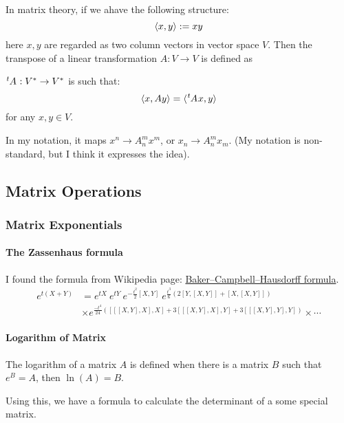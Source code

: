     In matrix theory, if we ahave the following structure:
    $$\braket{x,y} := x y$$
    here $x,y$ are regarded as two column vectors in vector space $V$.
    Then the transpose of a linear transformation $A:V\to V$ is defined
    as
    \begin{defi}[Transpose]
        $\tensor[^t]{A}{}:V^* \to V^*$ is such that:
        \begin{equation}
            \braket{x,Ay} = \braket{\tensor[^t]{A}{}x,y}
        \end{equation}
        for any $x,y\in V$.
    \end{defi}

    In my notation, it maps $x^n\to A^m_n x^m$, or $x_n\to A^m_n x_m$.
    (My notation is non-standard, but I think it expresses the idea).


\subsection{Matrix Operations}
    \subsubsection{Matrix Exponentials}
    \label{sec:Matrix-Exponentials}
    \paragraph{The Zassenhaus formula}
    I found the formula from Wikipedia page:
    \href{https://en.wikipedia.org/wiki/Baker%E2%80%93Campbell%E2%80%93Hausdorff_formula}{Baker–Campbell–Hausdorff formula}.
    \begin{align}
        e^{t(X+Y)} &= e^{tX}~ e^{tY} ~e^{-\frac{t^2}{2} [X,Y]} ~
        e^{\frac{t^3}{6}(2[Y,[X,Y]]+ [X,[X,Y]] )} \nonumber\\
        & \times
          e^{\frac{-t^4}{24}([[[X,Y],X],X] + 3[[[X,Y],X],Y] + 3[[[X,Y],Y],Y]) }
        \times\cdots
    \end{align}

    \paragraph{Logarithm of Matrix}
    The logarithm of  a matrix $A$ is defined when there is a matrix $B$ such that
    $e^B=A$, then $\ln(A)=B$.

    Using this, we have a formula to calculate the determinant of a some special
    matrix.

